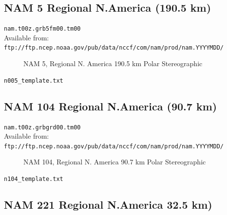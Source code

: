 \documentclass[11pt]{article}   %
\begin{document}
\clearpage
\subsection{NAM 5 Regional N.America (190.5 km)}

\verb|nam.t00z.grb5fm00.tm00|\\
Available from:\\
\verb|ftp://ftp.ncep.noaa.gov/pub/data/nccf/com/nam/prod/nam.YYYYMDD/| \\

\begin{figure}[htbp]\begin{center}
\parbox{15cm}{\caption{\label{FigNAM005}
NAM 5, Regional N. America 190.5 km Polar Stereographic
}}
\end{center}\end{figure}
\clearpage
\verb|n005_template.txt| \\
\tiny  \normalsize


\clearpage
\subsection{NAM 104 Regional N.America (90.7 km)}

\verb|nam.t00z.grbgrd00.tm00|\\
Available from:\\
\verb|ftp://ftp.ncep.noaa.gov/pub/data/nccf/com/nam/prod/nam.YYYYMDD/| \\

\begin{figure}[htbp]\begin{center}
\parbox{15cm}{\caption{\label{FigNAM005}
NAM 104, Regional N. America 90.7 km Polar Stereographic
}}
\end{center}\end{figure}
\clearpage
\verb|n104_template.txt| \\
\tiny  \normalsize



\clearpage
\subsection{NAM 221 Regional N.America 32.5 km)}
\end{document}
